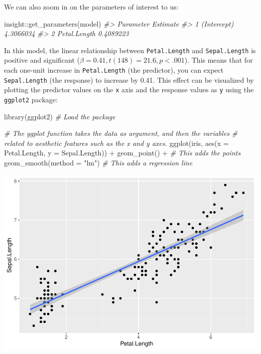 \documentclass[10pt,a4paper,onecolumn]{article}
\newenvironment{Shaded}{\begin{snugshade}}{\end{snugshade}}
\newcommand{\AttributeTok}[1]{\textcolor[rgb]{0.77,0.63,0.00}{#1}}
\newcommand{\CommentTok}[1]{\textcolor[rgb]{0.56,0.35,0.01}{\textit{#1}}}
\newcommand{\FunctionTok}[1]{\textcolor[rgb]{0.00,0.00,0.00}{#1}}
\newcommand{\NormalTok}[1]{#1}
\newcommand{\SpecialCharTok}[1]{\textcolor[rgb]{0.00,0.00,0.00}{#1}}
\newcommand{\StringTok}[1]{\textcolor[rgb]{0.31,0.60,0.02}{#1}}
\begin{document}
We can also zoom in on the parameters of interest to us:

\begin{Shaded}
\begin{Highlighting}[]
\NormalTok{insight}\SpecialCharTok{::}\FunctionTok{get\_parameters}\NormalTok{(model)}
\CommentTok{\#\textgreater{}      Parameter  Estimate}
\CommentTok{\#\textgreater{} 1  (Intercept) 4.3066034}
\CommentTok{\#\textgreater{} 2 Petal.Length 0.4089223}
\end{Highlighting}
\end{Shaded}

In this model, the linear relationship between \texttt{Petal.Length} and
\texttt{Sepal.Length} is positive and significant
(\(\beta = 0.41, t(148) = 21.6, p < .001\)). This means that for each
one-unit increase in \texttt{Petal.Length} (the predictor), you can
expect \texttt{Sepal.Length} (the response) to increase by 0.41. This
effect can be visualized by plotting the predictor values on the
\texttt{x} axis and the response values as \texttt{y} using the
\texttt{ggplot2} package:

\begin{Shaded}
\begin{Highlighting}[]
\FunctionTok{library}\NormalTok{(ggplot2) }\CommentTok{\# Load the package}

\CommentTok{\# The ggplot function takes the data as argument, and then the variables}
\CommentTok{\# related to aesthetic features such as the x and y axes.}
\FunctionTok{ggplot}\NormalTok{(iris, }\FunctionTok{aes}\NormalTok{(}\AttributeTok{x =}\NormalTok{ Petal.Length, }\AttributeTok{y =}\NormalTok{ Sepal.Length)) }\SpecialCharTok{+}
  \FunctionTok{geom\_point}\NormalTok{() }\SpecialCharTok{+} \CommentTok{\# This adds the points}
  \FunctionTok{geom\_smooth}\NormalTok{(}\AttributeTok{method =} \StringTok{"lm"}\NormalTok{) }\CommentTok{\# This adds a regression line}
\end{Highlighting}
\end{Shaded}

\includegraphics[width=1\linewidth]{paper_files/figure-latex/unnamed-chunk-5-1}
\end{document}
